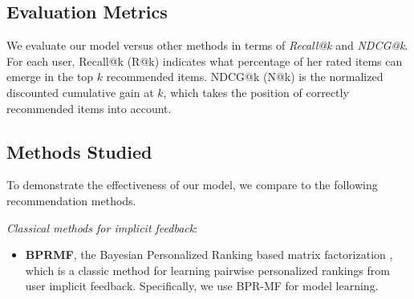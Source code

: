 \documentclass[sigconf]{acmart}
\begin{document}
\subsection{Evaluation Metrics}
We evaluate our model versus other methods in terms of \textit{Recall@k} and \textit{NDCG@k}. For each user, Recall@k (R@k) indicates what percentage of her rated items can emerge in the top $ k $ recommended items. NDCG@k (N@k) is the normalized discounted cumulative gain at $ k $, which takes the position of correctly recommended items into account. 

\begin{comment}

\begin{equation}
\begin{aligned}
& P@k =\frac{1}{M} \sum_{i=1}^{M} \frac{S_{i}(k) \cap T_{i}}{k},
R@k =\frac{1}{M} \sum_{i=1}^{M} \frac{S_{i}(k) \cap T_{i}}{|T_{i}|}, \\
& MAP@k =\frac{1}{M} \sum^{M}_{i=1} \frac{\sum^{k}_{j=1} p(j) \times rel(j)}{|T_{i}|},
\end{aligned}
\end{equation}
where $ M $ is number of users, $ S_{i}(k) $ is a set of top-$ k $ unrated items recommended to user $ i $ excluding those items in the training, and $ T_{i} $ is a set of items that are rated by user $ i $ in the testing. $ p(j) $ is the precision of a cut-off rank list from $ 1 $ to $ j $, and $ rel(j) $ is an indicator function that equals to $ 1 $ if the item is rated in the testing, otherwise equals to $ 0 $.

\end{comment}


\subsection{Methods Studied}
To demonstrate the effectiveness of our model, we compare to the following recommendation methods.

\textit{Classical methods for implicit feedback}:
\begin{itemize}
\item \textbf{BPRMF}, the Bayesian Personalized Ranking based matrix factorization \cite{DBLP:conf/uai/RendleFGS09}, which is a classic method for learning pairwise personalized rankings from user implicit feedback. Specifically, we use BPR-MF for model learning.
\end{itemize}
\end{document}
